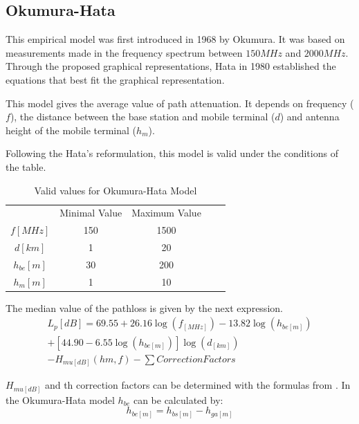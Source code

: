 \documentclass[letterpaper, 10 pt, conference]{ieeeconf}  %
\begin{document}
\subsection{Okumura-Hata}
This empirical model was first introduced in 1968 by Okumura. It was based on measurements made in the frequency spectrum between $ 150 MHz $ and $ 2000 MHz $. Through the proposed graphical representations, Hata in 1980 established the equations that best fit the graphical representation.\par\noindent
This model gives the average value of path attenuation. It depends on frequency ($ f $), the distance between the base station and mobile terminal ($ d $) and antenna height of the mobile terminal ($ h_m $).\par\noindent
Following the Hata's reformulation, this model is valid under the conditions of the table.
\begin{table}[h]
\centering
\begin{tabular}{|c|c|c|ll}
\cline{1-3}
            & Minimal Value & Maximum Value &  &  \\ \cline{1-3}
$f [MHz] $  & 150             & 1500            &  &  \\ \cline{1-3}
$d [km]$    & 1               & 20              &  &  \\ \cline{1-3}
$h_{be}[m]$ & 30              & 200             &  &  \\ \cline{1-3}
$h_m [m]$   & 1               & 10              &  &  \\ \cline{1-3}
\end{tabular}
\caption{Valid values for Okumura-Hata Model}
\label{tab:validadeHATA}
\end{table}
The median value of the pathloss is given by the next expression.
\begin{equation} \label{equation:Lpokumurahata}
\begin{split}
    L_p [dB] = 69.55+26.16\log(f_{[MHz]})-13.82\log(h_{be[m]})\\+[44.9
    0-6.55\log(h_{be[m]})]\log(d_{[km]})\\-H_{mu[dB]}(hm,f)- \sum Correction Factors
\end{split}
\end{equation}
\par\noindent
 $H_{mu[dB]}$ and th correction factors can be determined with the formulas from \cite{c1}. 
In the Okumura-Hata model $ h_ {be} $ can be calculated by:
\begin{equation}
    \label{equation: hbeOkhata}
    h_ {be [m]} = h_ {bs [m]} - h_ {ga [m]}
\end{equation}
\end{document}
